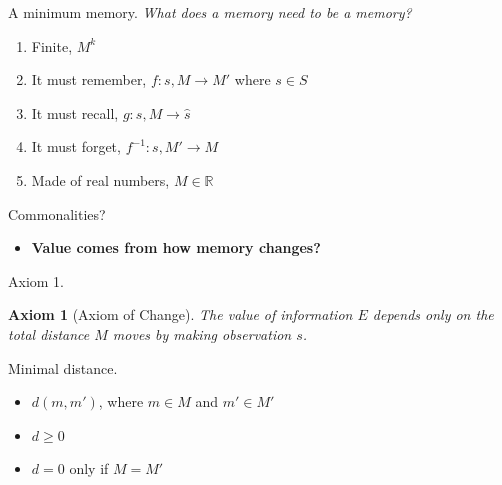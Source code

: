 \documentclass[10pt]{beamer}
\newtheorem{axiom}{Axiom}
\begin{document}
\begin{frame}[fragile]{A minimum memory.}
\textit{What does a memory need to be a memory?}
\begin{enumerate}
    \item Finite, $M^k$
    \item It must remember, $f : s, M \rightarrow M'$ where $s \in S$
    \item It must recall, $g : s, M \rightarrow \hat s$
    \item It must forget, $f^{-1} : s, M' \rightarrow M$
    \item Made of real numbers, $M \in \mathbb{R}$
\end{enumerate}
\end{frame}

\begin{frame}[fragile]{Commonalities?}
\begin{itemize}
    \begin{itemize}
    \item Novelty
    \item Counts/Successors
    \item Information gain
    \item Mutual information
    \item State prediction
    \end{itemize} \\
    \item \textbf{Value comes from how memory changes?}
\end{itemize}
\end{frame}

\begin{frame}[fragile]{Axiom 1.}
\begin{axiom}
    [Axiom of Change] The value of information $E$ depends only on the total distance $M$ moves by making observation $s$.
    \label{ax:1} 
\end{axiom}
\end{frame}

\begin{frame}[fragile]{Minimal distance.}
\begin{itemize}
    \item $d(m,m')$, where $m \in M$ and $m' \in M'$
    \item $d \ge 0$
    \item $d = 0$ only if $M = M'$
\end{itemize}
\end{frame}
\end{document}
